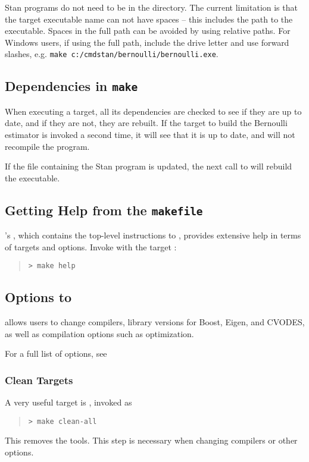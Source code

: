 Stan programs do not need to be in the 
directory. The current limitation is that the target executable name
can not have spaces -- this includes the path to the
executable. Spaces in the full path can be avoided by using relative
paths. For Windows users, if using the full path, include the drive
letter and use forward slashes,
e.g. \verb+make c:/cmdstan/bernoulli/bernoulli.exe+.

\subsection{Dependencies in {\tt\bfseries make}}

When executing a  target, all its dependencies are checked
to see if they are up to date, and if they are not, they are rebuilt.
If the  target to build the Bernoulli estimator is invoked
a second time, it will see that it is up to date, and will not
recompile the program.

If the file containing the Stan program is updated, the next call to
 will rebuild the \CmdStan executable.


\subsection{Getting Help from the {\tt makefile}}

\CmdStan's , which contains the top-level instructions to
, provides extensive help in terms of targets and options. Invoke
 with the target :
%
\begin{quote}
\begin{Verbatim}[fontshape=sl]
> make help
\end{Verbatim}
\end{quote}

\subsection{Options to }

\CmdStan allows users to change compilers, library versions for Boost,
Eigen, and CVODES, as well as compilation options such as
optimization.

For a full list of options, see 



\subsubsection{Clean Targets}

A very useful target is , invoked as
%
\begin{quote}
\begin{Verbatim}[fontshape=sl]
> make clean-all
\end{Verbatim}
\end{quote}
%
This removes the \CmdStan tools. This step is necessary when changing
compilers or other  options.
